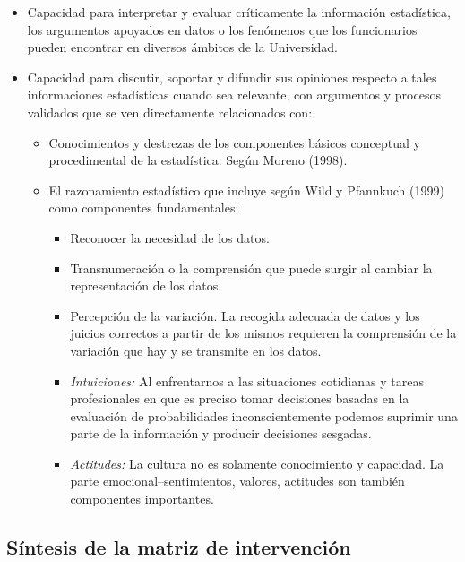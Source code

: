 \documentclass[
]{book}
\begin{document}
\begin{itemize}
\item
  Capacidad para interpretar y evaluar críticamente la
  información estadística, los argumentos apoyados en
  datos o los fenómenos que los funcionarios pueden
  encontrar en diversos ámbitos de la Universidad.
\item
  Capacidad para discutir, soportar y difundir sus
  opiniones respecto a tales informaciones
  estadísticas cuando sea relevante, con argumentos y
  procesos validados que se ven directamente
  relacionados con:

  \begin{itemize}
  \item
    Conocimientos y destrezas de los componentes
    básicos conceptual y procedimental de la
    estadística. Según Moreno (1998).
  \item
    El razonamiento estadístico que incluye según
    Wild y Pfannkuch (1999) como componentes
    fundamentales:

    \begin{itemize}
    \item
      Reconocer la necesidad de los datos.
    \item
      Transnumeración o la comprensión que puede
      surgir al cambiar la representación de los
      datos.
    \item
      Percepción de la variación. La recogida
      adecuada de datos y los juicios correctos a
      partir de los mismos requieren la
      comprensión de la variación que hay y se
      transmite en los datos.
    \item
      \emph{Intuiciones:} Al enfrentarnos a las
      situaciones cotidianas y tareas
      profesionales en que es preciso tomar
      decisiones basadas en la evaluación de
      probabilidades inconscientemente podemos
      suprimir una parte de la información y
      producir decisiones sesgadas.
    \item
      \emph{Actitudes:} La cultura no es solamente conocimiento y capacidad. La parte emocional--sentimientos, valores, actitudes son también componentes importantes.
    \end{itemize}
  \end{itemize}
\end{itemize}

\hypertarget{suxedntesis-de-la-matriz-de-intervenciuxf3n}{%
\subsection{Síntesis de la matriz de intervención}\label{suxedntesis-de-la-matriz-de-intervenciuxf3n}}
\end{document}
